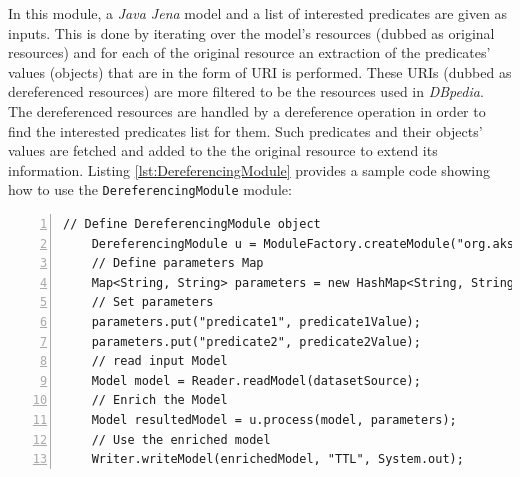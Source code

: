 \documentclass[a4paper,twoside,bibtotoc,abstracton,12pt,BCOR=15mm]{article}
\begin{document}

    In this module, a \emph{Java Jena} model and a list of interested predicates are given as inputs.
    This is done by iterating over the model's resources (dubbed as original resources) 
    and for each of the original resource an extraction of the predicates' values (objects) that are in the form of URI is performed. 
    These URIs (dubbed as dereferenced resources) are more filtered to be the resources used in \emph{DBpedia}.
    The dereferenced resources are handled by a dereference operation in order to find the interested predicates list for them.
    Such predicates and their objects' values are fetched and added to the the original resource to extend its information.
    Listing \ref{lst:DereferencingModule} provides a sample code showing how to use the \texttt{DereferencingModule} module:

    \begin{lstlisting}[label=lst:DereferencingModule, float=tp, numbers=left, numberstyle=\tiny, caption = Code fragment to call the \texttt{DereferencingModule} class.]
    // Define DereferencingModule object
    DereferencingModule u = ModuleFactory.createModule("org.aksw.deer.resources.dereferencing");
    // Define parameters Map
    Map<String, String> parameters = new HashMap<String, String>();
    // Set parameters
    parameters.put("predicate1", predicate1Value);
    parameters.put("predicate2", predicate2Value);
    // read input Model
    Model model = Reader.readModel(datasetSource);
    // Enrich the Model
    Model resultedModel = u.process(model, parameters);
    // Use the enriched model
    Writer.writeModel(enrichedModel, "TTL", System.out);
    \end{lstlisting}
\end{document}
